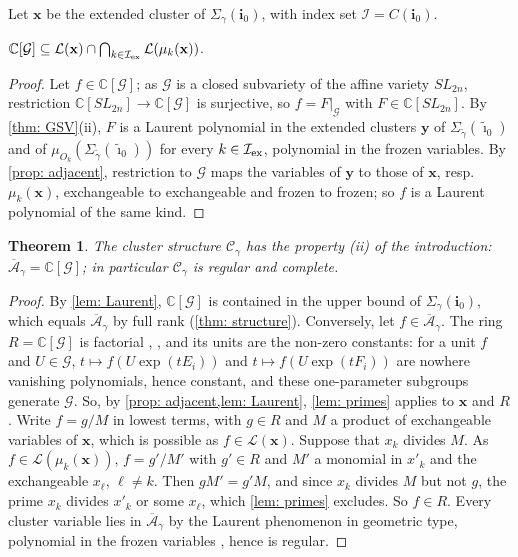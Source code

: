 \documentclass[a4paper]{amsart}
\numberwithin{equation}{section}
\newtheorem{theorem}{Theorem}[section]
\theoremstyle{definition}
\theoremstyle{remark}
\newcommand{\bbC}{\mathbb{C}}
\newcommand{\mcG}{\mathcal{G}}
\newcommand{\mcC}{\mathcal{C}}
\newcommand{\mcL}{\mathcal{L}}
\newcommand{\mcI}{\mathcal{I}}
\newcommand{\oA}{\overline{\mathcal{A}}}
\newcommand{\bfi}{\mathbf{i}}
\newcommand{\tbfi}{\widetilde{\boldsymbol{\imath}}}
\newcommand{\bx}{\mathbf{x}}
\newcommand{\by}{\mathbf{y}}
\newcommand{\tg}{\widetilde{\gamma}}
\newcommand{\ex}{{\rm ex}}
\newcommand{\SL}{SL_{2n}}
\begin{document}
Let $\bx$ be the extended cluster of $\Sigma_\gamma(\bfi_0)$, with index set $\mcI=C(\bfi_0)$.

\begin{lemma}
  \label{lem: Laurent}
  $\bbC[\mcG]\subseteq\mcL(\bx)\cap\bigcap_{k\in \mcI_\ex}\mcL(\mu_k(\bx))$.
\end{lemma}
\begin{proof}
  Let $f\in\bbC[\mcG]$; as $\mcG$ is a closed subvariety of the affine variety $\SL$, restriction $\bbC[\SL]\to\bbC[\mcG]$ is surjective, so $f=F|_\mcG$ with $F\in\bbC[\SL]$.
  By \cref{thm: GSV}(ii), $F$ is a Laurent polynomial in the extended clusters $\by$ of $\Sigma_{\tg}(\tbfi_0)$ and of $\mu_{O_k}(\Sigma_{\tg}(\tbfi_0))$ for every $k\in \mcI_\ex$, polynomial in the frozen variables.
  By \cref{prop: adjacent}, restriction to $\mcG$ maps the variables of $\by$ to those of $\bx$, resp.\ $\mu_k(\bx)$, exchangeable to exchangeable and frozen to frozen; so $f$ is a Laurent polynomial of the same kind.
\end{proof}


\begin{theorem}
  \label{thm: complete}
  The cluster structure $\mcC_\gamma$ has the property (ii) of the introduction: $\oA_\gamma=\bbC[\mcG]$; in particular $\mcC_\gamma$ is regular and complete.
\end{theorem}
\begin{proof}
  By \cref{lem: Laurent}, $\bbC[\mcG]$ is contained in the upper bound of $\Sigma_\gamma(\bfi_0)$, which equals $\oA_\gamma$ by full rank (\cref{thm: structure}).
  Conversely, let $f\in\oA_\gamma$.
  The ring $R=\bbC[\mcG]$ is factorial \cite[Proposition~1 and Corollary]{Pop74}, \cite[Theorem~3]{KP83}, and its units are the non-zero constants: for a unit $f$ and $U\in\mcG$, $t\mapsto f(U\exp(tE_i))$ and $t\mapsto f(U\exp(tF_i))$ are nowhere vanishing polynomials, hence constant, and these one-parameter subgroups generate $\mcG$. So, by \cref{prop: adjacent,lem: Laurent}, \cref{lem: primes} applies to $\bx$ and $R$.
  Write $f=g/M$ in lowest terms, with $g\in R$ and $M$ a product of exchangeable variables of $\bx$, which is possible as $f\in\mcL(\bx)$.
  Suppose that $x_k$ divides $M$.
  As $f\in\mcL(\mu_k(\bx))$, $f=g'/M'$ with $g'\in R$ and $M'$ a monomial in $x'_k$ and the exchangeable $x_\ell$, $\ell\neq k$.
  Then $gM'=g'M$, and since $x_k$ divides $M$ but not $g$, the prime $x_k$ divides $x'_k$ or some $x_\ell$, which \cref{lem: primes} excludes.
  So $f\in R$. Every cluster variable lies in $\oA_\gamma$ by the Laurent phenomenon in geometric type, polynomial in the frozen variables \cite[Proposition~11.2]{FZ03}, hence is regular.
\end{proof}
\end{document}
